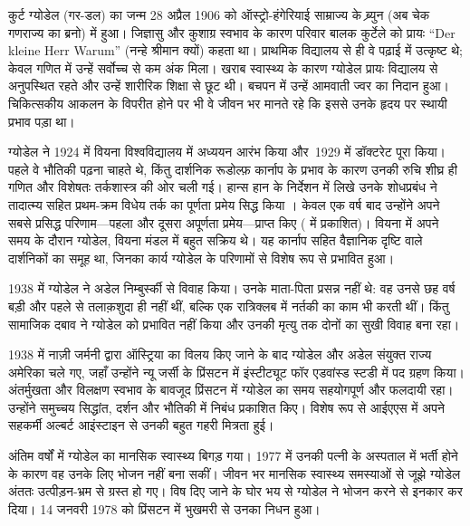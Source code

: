 \documentclass[../../../include/open-logic-section]{subfiles}
\begin{document}



कुर्ट ग्योडेल (\textsc{गर}-डल) का जन्म 28 अप्रैल 1906 को ऑस्ट्रो-हंगेरियाई
साम्राज्य के ब्र्युन (अब चेक गणराज्य का ब्रनो) में हुआ। जिज्ञासु और कुशाग्र
स्वभाव के कारण परिवार बालक कुर्टेले को प्रायः ``Der kleine Herr Warum''
(नन्हे श्रीमान क्यों) कहता था। प्राथमिक विद्यालय से ही वे पढ़ाई में उत्कृष्ट
थे; केवल गणित में उन्हें सर्वोच्च से कम अंक मिला। खराब स्वास्थ्य के कारण
ग्योडेल प्रायः विद्यालय से अनुपस्थित रहते और उन्हें शारीरिक शिक्षा से छूट
थी। बचपन में उन्हें आमवाती ज्वर का निदान हुआ। चिकित्सकीय आकलन के विपरीत होने
पर भी वे जीवन भर मानते रहे कि इससे उनके हृदय पर स्थायी प्रभाव पड़ा था।

ग्योडेल ने 1924 में वियना विश्वविद्यालय में अध्ययन आरंभ किया और~1929 में
डॉक्टरेट पूरा किया। पहले वे भौतिकी पढ़ना चाहते थे, किंतु दार्शनिक रूडोल्फ़
कार्नाप के प्रभाव के कारण उनकी रुचि शीघ्र ही गणित और विशेषतः तर्कशास्त्र की
ओर चली गई। हान्स हान के निर्देशन में लिखे उनके शोधप्रबंध ने तादात्म्य सहित
प्रथम-क्रम विधेय तर्क का पूर्णता प्रमेय सिद्ध किया \citep{Godel1929}। केवल
एक वर्ष बाद उन्होंने अपने सबसे प्रसिद्ध परिणाम---पहला और दूसरा अपूर्णता
प्रमेय---प्राप्त किए (\citealt{Godel1931} में प्रकाशित)। वियना में अपने समय
के दौरान ग्योडेल, वियना मंडल में बहुत सक्रिय थे। यह कार्नाप सहित वैज्ञानिक
दृष्टि वाले दार्शनिकों का समूह था, जिनका कार्य ग्योडेल के परिणामों से विशेष
रूप से प्रभावित हुआ।

1938 में ग्योडेल ने अडेल निम्बुर्स्की से विवाह किया। उनके माता-पिता प्रसन्न
नहीं थे: वह उनसे छह वर्ष बड़ी और पहले से तलाक़शुदा ही नहीं थीं, बल्कि एक
रात्रिक्लब में नर्तकी का काम भी करती थीं। किंतु सामाजिक दबाव ने ग्योडेल को
प्रभावित नहीं किया और उनकी मृत्यु तक दोनों का सुखी विवाह बना रहा।

1938 में नाज़ी जर्मनी द्वारा ऑस्ट्रिया का विलय किए जाने के बाद ग्योडेल और
अडेल संयुक्त राज्य अमेरिका चले गए, जहाँ उन्होंने न्यू जर्सी के प्रिंसटन में
इंस्टीट्यूट फॉर एडवांस्ड स्टडी में पद ग्रहण किया। अंतर्मुखता और विलक्षण
स्वभाव के बावजूद प्रिंसटन में ग्योडेल का समय सहयोगपूर्ण और फलदायी रहा।
उन्होंने समुच्चय सिद्धांत, दर्शन और भौतिकी में निबंध प्रकाशित किए। विशेष रूप
से आईएएस में अपने सहकर्मी अल्बर्ट आइंस्टाइन से उनकी बहुत गहरी मित्रता हुई।

अंतिम वर्षों में ग्योडेल का मानसिक स्वास्थ्य बिगड़ गया। 1977 में उनकी पत्नी
के अस्पताल में भर्ती होने के कारण वह उनके लिए भोजन नहीं बना सकीं। जीवन भर
मानसिक स्वास्थ्य समस्याओं से जूझे ग्योडेल अंततः उत्पीड़न-भ्रम से ग्रस्त हो
गए। विष दिए जाने के घोर भय से ग्योडेल ने भोजन करने से इनकार कर दिया। 14
जनवरी 1978 को प्रिंसटन में भुखमरी से उनका निधन हुआ।
\end{document}
